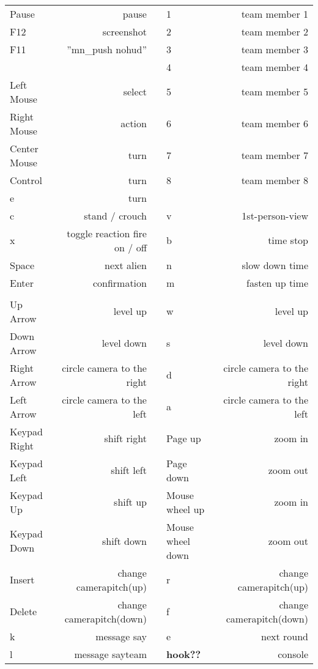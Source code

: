 \paragraph*{}
\begin{tabular}{|lrclr|}
\hline 
Pause 							 & pause  					 			&  & 1 & team member 1	\\ 
F12 								 & screenshot  						&  & 2 & team member 2	\\ 
F11 								 & ''mn_push nohud'' 				&  & 3 & team member 3	\\ 
 									 & 								 			&  & 4 & team member 4	\\  
Left Mouse				 	 & select									&  & 5 & team member 5	\\ 
Right Mouse  				 & action						 			&  & 6 & team member 6	\\ 
Center Mouse 			  	 & turn								 		&  & 7 & team member 7	\\ 
Control 						 & turn 									&  & 8 & team member 8 	\\ 
e									 &	 turn										&  & 	&								\\ 
c									 &  stand / crouch		 			&  & v	&	1st-person-view 	\\ 
x 									 & toggle reaction fire on / off &  & b	& time stop				\\ 
Space 							 & next alien 							&  & n 	& slow down time 	\\ 
Enter 							 & confirmation 						&  & m & fasten up time 	\\ 
 									 &  											&  &  	&  							\\ 
Up Arrow 						 & level up 								&  & w 	& level up 				\\ 
Down Arrow 					 & level down  							&  & s 	& level down 			\\ 
Right Arrow 					 & circle camera to the right 	&  & d 	& circle camera to the right 				\\ 
Left Arrow 					 & circle camera to the left 		&  & a  & circle camera to the left 					\\ 
Keypad Right 				 & shift right 							&  & Page up 					& zoom in  				\\ 
Keypad Left 					 & shift left  								&  & Page down 				& zoom out 			\\ 
Keypad Up 					 & shift up 								&  & Mouse wheel up 		& zoom in 				\\ 
Keypad Down 				 & shift down 							&  & Mouse wheel down & zoom out  			\\ 
Insert 							 & change camerapitch(up)	&  & r 								& change camerapitch(up)		\\
Delete 							 & change camerapitch(down) &  & f 								& change camerapitch(down)	\\
k  									 & message say 						&  & e 								& next round			\\
l 									 & message sayteam 				&  & \textbf{ hook??}		& 	console 				\\
\hline
\end{tabular} 

